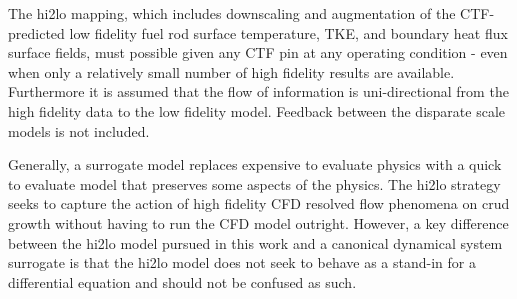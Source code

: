 The hi2lo mapping, which includes downscaling and augmentation of the CTF-predicted low fidelity fuel rod surface temperature, TKE, and boundary heat flux surface fields, must possible given any CTF pin at any operating condition - even when only a relatively small number of high fidelity results are available.  Furthermore it is assumed that the flow of information is uni-directional from the high fidelity data to the low fidelity model.  Feedback between the disparate scale models is not included.

Generally, a surrogate model replaces expensive to evaluate physics with a quick to evaluate model that preserves some aspects of the physics. The hi2lo strategy seeks to capture the action of high fidelity CFD resolved flow phenomena on crud growth without having to run the CFD model outright.  However, a key difference between the hi2lo model pursued in this work and a canonical dynamical system surrogate is that the hi2lo model does not seek to behave as a stand-in for a differential equation and should not be confused as such.  

